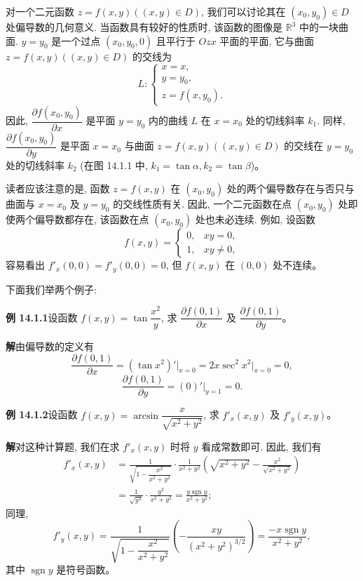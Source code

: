 \documentclass[UTF8, 12pt, fontset=fandol, oneside]{ctexart}
\begin{document}
对一个二元函数 $z=f(x,y)((x,y)\in D)$, 我们可以讨论其在 $(x_0,y_0)\in D$ 处偏导数的几何意义. 当函数具有较好的性质时, 该函数的图像是 $\mathbb R^3$ 中的一块曲面. $y=y_0$ 是一个过点 $(x_0,y_0,0)$ 且平行于 $Ozx$ 平面的平面, 它与曲面 $z=f(x,y)((x,y)\in D)$ 的交线为
\[
  L:\begin{cases}
    x=x,\\
    y=y_0,\\
    z=f(x,y_0).
  \end{cases}
\]
因此, $\dfrac{\partial f(x_0,y_0)}{\partial x}$ 是平面 $y=y_0$ 内的曲线 $L$ 在 $x=x_0$ 处的切线斜率 $k_1$. 同样, $\dfrac{\partial f(x_0,y_0)}{\partial y}$ 是平面 $x=x_0$ 与曲面 $z=f(x,y)((x,y)\in D)$ 的交线在 $y=y_0$ 处的切线斜率 $k_2$ (在图 14.1.1 中, $k_1=\tan\alpha, k_2=\tan\beta$)。

读者应该注意的是, 函数 $z=f(x,y)$ 在 $(x_0,y_0)$ 处的两个偏导数存在与否只与曲面与 $x=x_0$ 及 $y=y_0$ 的交线性质有关. 因此, 一个二元函数在点 $(x_0,y_0)$ 处即使两个偏导数都存在, 该函数在点 $(x_0,y_0)$ 处也未必连续. 例如, 设函数
\[
  f(x,y)=
  \begin{cases}
    0, & xy=0,\\
    1, & xy\ne0,
  \end{cases}
\]
容易看出 $f'_x(0,0)=f'_y(0,0)=0$, 但 $f(x,y)$ 在 $(0,0)$ 处不连续。

下面我们举两个例子:

\noindent\textbf{例 14.1.1}\quad 设函数 $f(x,y)=\tan\dfrac{x^2}{y}$, 求 $\dfrac{\partial f(0,1)}{\partial x}$ 及 $\dfrac{\partial f(0,1)}{\partial y}$。

\noindent\textbf{解}\quad 由偏导数的定义有
\[
  \frac{\partial f(0,1)}{\partial x}
  =(\tan x^2)'\big|_{x=0}
  =2x\sec^2 x^2\big|_{x=0}=0,
\]
\[
  \frac{\partial f(0,1)}{\partial y}
  =(0)'\big|_{y=1}=0.
\]

\noindent\textbf{例 14.1.2}\quad 设函数 $f(x,y)=\arcsin\dfrac{x}{\sqrt{x^2+y^2}}$, 求 $f'_x(x,y)$ 及 $f'_y(x,y)$。

\noindent\textbf{解}\quad 对这种计算题, 我们在求 $f'_x(x,y)$ 时将 $y$ 看成常数即可. 因此, 我们有
\[
\begin{aligned}
  f'_x(x,y)
  &=
  \frac{1}{\sqrt{1-\dfrac{x^2}{x^2+y^2}}}\cdot
  \frac{1}{x^2+y^2}
  \left(\sqrt{x^2+y^2}-\frac{x^2}{\sqrt{x^2+y^2}}\right)\\
  &=\frac{1}{\sqrt{y^2}}\cdot\frac{y^2}{x^2+y^2}
  =\frac{y\operatorname{sgn} y}{x^2+y^2};
\end{aligned}
\]
同理,
\[
  f'_y(x,y)
  =
  \frac{1}{\sqrt{1-\dfrac{x^2}{x^2+y^2}}}
  \left(-\frac{xy}{(x^2+y^2)^{3/2}}\right)
  =\frac{-x\operatorname{sgn} y}{x^2+y^2},
\]
其中 $\operatorname{sgn} y$ 是符号函数。
\end{document}
